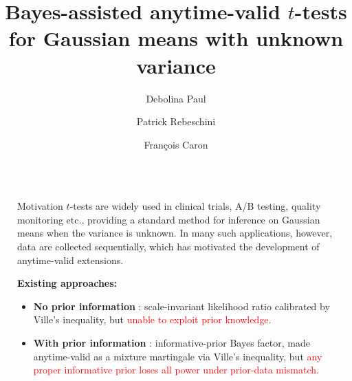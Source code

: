 \documentclass[final]{beamer}
\title{Bayes-assisted anytime-valid \texorpdfstring{$t$}{t}-tests for Gaussian means with unknown variance}
\author{Debolina Paul \and Patrick Rebeschini \and Fran\c{c}ois Caron}
\institute[shortinst]{Department of Statistics, University of Oxford}
\newlength{\sepwidth}
\newlength{\colwidth}
\newcommand{\separatorcolumn}{\begin{column}{\sepwidth}\end{column}}
\begin{document}
\begin{frame}[t]
\begin{columns}[t]
\separatorcolumn

\begin{column}{\colwidth}

  \begin{block}{Motivation}
$t$-tests are widely used in clinical trials, A/B testing, quality monitoring etc., providing a standard method for inference on Gaussian means when the variance is unknown. In many such applications, however, data are collected sequentially, which has motivated the development of anytime-valid extensions.

\textbf{Existing approaches:}
\begin{itemize}
  \setlength\itemsep{0.08cm}
  \item \textbf{No prior information} \cite{Lai1976,PerezOrtiz2024,Wang2025}: scale-invariant likelihood ratio calibrated by Ville's inequality, but \textcolor{red}{unable to exploit prior knowledge.}
  \item \textbf{With prior information} \cite{Rouder2009, gronau2020informed}: informative-prior Bayes factor, made anytime-valid as a mixture martingale via Ville's inequality, but \textcolor{red}{any proper informative prior loses all power under prior-data mismatch.}
\end{itemize}

  \begin{center}
\end{center}
\end{block}
\end{column}
\end{columns}
\end{frame}
\end{document}
